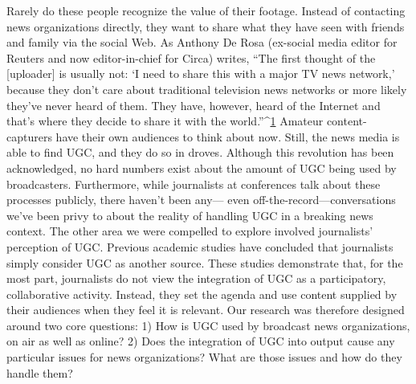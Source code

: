 \begin{enumerate}
Rarely do these people recognize the value of their footage. Instead of contacting news organizations directly, they want to share what they have seen with friends and family via the social Web. As Anthony De Rosa (ex-social media editor for Reuters and now editor-in-chief for Circa) writes, ``The first thought of the [uploader] is usually not: ‘I need to share this with a major TV news network,' because they don't care about traditional television news networks or more likely they've never heard of them. They have, however, heard of the Internet and that's where they decide to share it with the world.''^{\href{#endnotes}{1}} Amateur content-capturers have their own audiences to think
about now.
Still, the news media is able to find UGC, and they do so in droves. Although
this revolution has been acknowledged, no hard numbers exist about the
amount of UGC being used by broadcasters. Furthermore, while journalists
at conferences talk about these processes publicly, there haven't been any—
even off-the-record—conversations we've been privy to about the reality of
handling UGC in a breaking news context.
The other area we were compelled to explore involved journalists' perception
of UGC. Previous academic studies have concluded that journalists
simply consider UGC as another source. These studies demonstrate that,
for the most part, journalists do not view the integration of UGC as a participatory,
collaborative activity. Instead, they set the agenda and use content
supplied by their audiences when they feel it is relevant.
Our research was therefore designed around two core questions:
1) How is UGC used by broadcast news organizations, on air as
well as online?
2) Does the integration of UGC into output cause any particular
issues for news organizations? What are those issues and how do
they handle them?


\end{enumerate}
